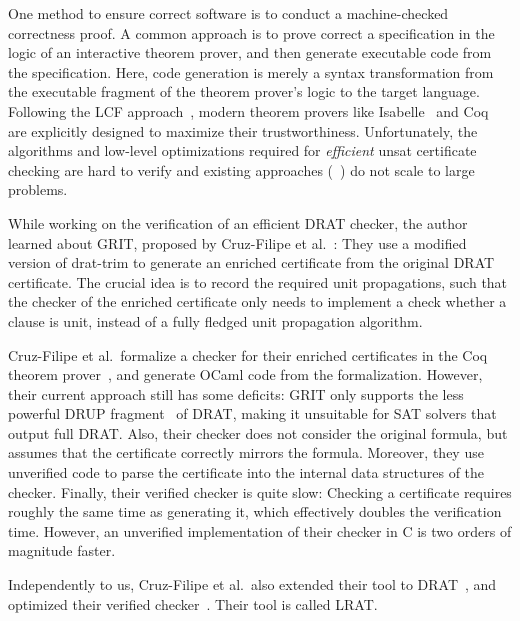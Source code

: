 \documentclass[smallcondensed]{svjour3}     %
\begin{document}
One method to ensure correct software is to conduct a machine-checked correctness proof. 
A common approach is to prove correct a specification in the logic of an interactive theorem prover, and then generate executable code from 
the specification. Here, code generation is merely a syntax transformation from the executable fragment of the theorem prover's logic to the target language.
Following the LCF approach~\cite{Gord00}, modern theorem provers like Isabelle~\cite{NPW02} and Coq~\cite{BeCa10} are explicitly designed to maximize their trustworthiness.
Unfortunately, the algorithms and low-level optimizations required for \emph{efficient} unsat certificate checking are 
hard to verify and existing approaches (\eg~\cite{DFM10,WHH13}) do not scale to large problems.

While working on the verification of an efficient DRAT checker, the author learned about GRIT, proposed by Cruz-Filipe et al.~\cite{CMS17}: 
They use a modified version of drat-trim to generate an enriched certificate from the original DRAT certificate. 
The crucial idea is to record the required unit propagations, such that the checker of the enriched certificate only needs 
to implement a check whether a clause is unit, instead of a fully fledged unit propagation algorithm.

Cruz-Filipe et al.\ formalize a checker for their enriched certificates in the Coq theorem prover~\cite{BeCa10}, and generate OCaml code from the formalization. 
However, their current approach still has some deficits:
GRIT only supports the less powerful DRUP fragment~\cite{WHH13} of DRAT, making it unsuitable for SAT solvers that output full DRAT.
Also, their checker does not consider the original formula, but assumes that the certificate correctly mirrors the formula. 
Moreover, they use unverified code to parse the certificate into the internal data structures of the checker.
Finally, their verified checker is quite slow: Checking a certificate requires roughly the same time as generating it, which effectively doubles the verification time.
However, an unverified implementation of their checker in C is two orders of magnitude faster.

Independently to us, Cruz-Filipe et al.~also extended their tool to DRAT~\cite{CHHKS17}, and optimized their verified checker~\cite{HHKW17}. Their tool is called LRAT.
\end{document}
